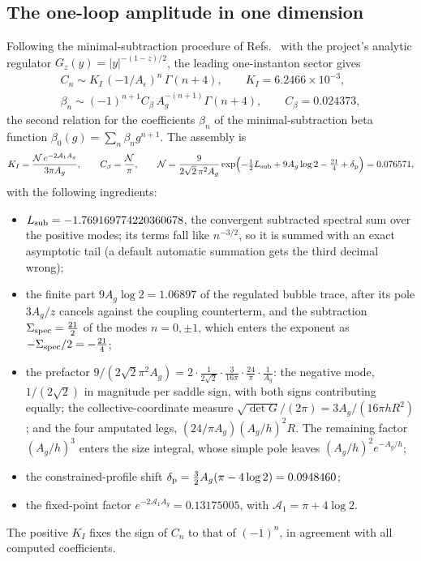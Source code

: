 \documentclass[11pt,a4paper]{article}
\numberwithin{equation}{section}
\newcommand{\Ae}{A_\epsilon}
\newcommand{\Ag}{A_g}
\newcommand{\sci}[2]{#1\times10^{#2}}
\begin{document}
\subsection{The one-loop amplitude in one dimension}\label{sec:amplitude}
Following the minimal-subtraction procedure of
Refs.~\cite{McKane:2018ocs,McKaneWallaceBonfim} with the project's analytic regulator
$G_z(y)=|y|^{-(1-z)/2}$, the leading one-instanton sector gives
\begin{equation}
 \begin{gathered}
 C_n\sim K_I\,(-1/\Ae)^n\,\Gamma(n+4),\qquad K_I=\sci{6.2466}{-3},\\
 \beta_n\sim(-1)^{n+1}C_\beta\,\Ag^{-(n+1)}\Gamma(n+4),\qquad C_\beta=0.024373,
 \end{gathered}
 \label{eq:KI}
\end{equation}
the second relation for the coefficients $\beta_n$ of the minimal-subtraction beta
function $\beta_0(g)=\sum_n\beta_ng^{n+1}$. The assembly is
\begin{equation}
 K_I=\frac{\mathcal N\,e^{-2\mathcal A_1\Ag}}{3\pi\Ag},\qquad
 C_\beta=\frac{\mathcal N}{\pi},\qquad
 \mathcal N=\frac{9}{2\sqrt2\,\pi^2\Ag}
 \exp\Bigl(-\tfrac12L_{\rm sub}+9\Ag\log2-\tfrac{21}{4}+\delta_{\rm p}\Bigr)=0.076571,
 \label{eq:assembly}
\end{equation}
with the following ingredients:
\begin{itemize}
\item $L_{\rm sub}=-1.769169774220360678$, the convergent subtracted spectral sum over the
positive modes; its terms fall like $n^{-3/2}$, so it is summed with an exact asymptotic tail
(a default automatic summation gets the third decimal wrong);
\item the finite part $9\Ag\log2=1.06897$ of the regulated bubble trace, after its pole
$3\Ag/z$ cancels against the coupling counterterm, and the subtraction
$\Sigma_{\rm spec}=\frac{21}{2}$ of the modes $n=0,\pm1$, which enters the exponent as
$-\Sigma_{\rm spec}/2=-\frac{21}{4}$;
\item the prefactor $9/(2\sqrt2\pi^2\Ag)=2\cdot\frac{1}{2\sqrt2}\cdot\frac{3}{16\pi}\cdot
\frac{24}{\pi}\cdot\frac1{\Ag}$: the negative mode, $1/(2\sqrt2)$ in magnitude per saddle sign,
with both signs contributing equally; the collective-coordinate measure
$\sqrt{\det G}/(2\pi)=3\Ag/(16\pi hR^2)$; and the four amputated legs,
$(24/\pi\Ag)(\Ag/h)^2R$. The remaining factor $(\Ag/h)^3$ enters the size integral, whose
simple pole leaves $(\Ag/h)^2e^{-\Ag/h}$;
\item the constrained-profile shift $\delta_{\rm p}=\frac32\Ag(\pi-4\log2)=0.0948460$;
\item the fixed-point factor $e^{-2\mathcal A_1\Ag}=0.13175005$, with
$\mathcal A_1=\pi+4\log2$.
\end{itemize}
The positive $K_I$ fixes the sign of $C_n$ to that of $(-1)^n$, in agreement with all
computed coefficients.
\end{document}
